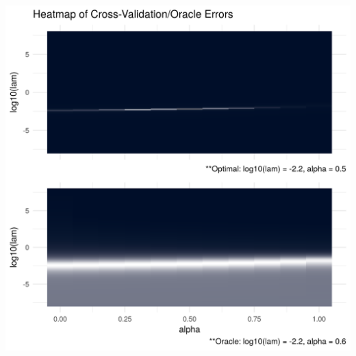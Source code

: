 \documentclass[11pt,]{book}
\theoremstyle{definition}
\theoremstyle{definition}
\theoremstyle{definition}
\theoremstyle{remark}
\begin{document}
\includegraphics{images/repsKLdense_N50_P10.png}

\vspace{0.5cm}
\end{document}
